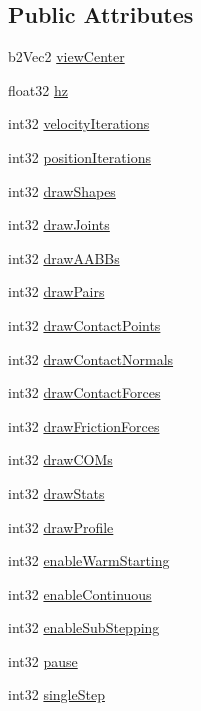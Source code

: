 \subsection*{Public Attributes}
\begin{DoxyCompactItemize}
\item 
b2\-Vec2 \hyperlink{structSettings_a9f73ff7bfe24c0ec00f00637ad660afa}{view\-Center}
\item 
float32 \hyperlink{structSettings_a81f52938e3bfe4976755e77e940ca0e0}{hz}
\item 
int32 \hyperlink{structSettings_aef56168e9043d5a6f264a57fc0d0823a}{velocity\-Iterations}
\item 
int32 \hyperlink{structSettings_ae66b1defd12295dd5dce2362fcdad12f}{position\-Iterations}
\item 
int32 \hyperlink{structSettings_a4a8172dd21368b12a8442723f30914bf}{draw\-Shapes}
\item 
int32 \hyperlink{structSettings_ab03e798642ff7d039d5efa3e0d5e86cb}{draw\-Joints}
\item 
int32 \hyperlink{structSettings_a7ac6f10e3c8e20e8e9a7b7fa90f4b5b5}{draw\-A\-A\-B\-Bs}
\item 
int32 \hyperlink{structSettings_a393ea9824e615323134a9f8514d51ef7}{draw\-Pairs}
\item 
int32 \hyperlink{structSettings_afdc2b5f2611fc52d082e2ff69242cd9b}{draw\-Contact\-Points}
\item 
int32 \hyperlink{structSettings_ad95473a203267e76c613f3a7c2677836}{draw\-Contact\-Normals}
\item 
int32 \hyperlink{structSettings_a55646015c8d056282396c5a8511bc99a}{draw\-Contact\-Forces}
\item 
int32 \hyperlink{structSettings_a9a5046eae0535fff1e23479d18ecaa15}{draw\-Friction\-Forces}
\item 
int32 \hyperlink{structSettings_af5595d1914a8f3b76b43224cc16f05fc}{draw\-C\-O\-Ms}
\item 
int32 \hyperlink{structSettings_ac1dc47bd42cb02ab564d16973c3ac235}{draw\-Stats}
\item 
int32 \hyperlink{structSettings_ab2f2f8bbbd3cf9997000d229f4caff31}{draw\-Profile}
\item 
int32 \hyperlink{structSettings_adb8ab5ccbdefc201db87e2d451df1758}{enable\-Warm\-Starting}
\item 
int32 \hyperlink{structSettings_a5c4a2f9de9c8934d149dc352fc600bf1}{enable\-Continuous}
\item 
int32 \hyperlink{structSettings_a13446b165febfb28b59adcce030d29cc}{enable\-Sub\-Stepping}
\item 
int32 \hyperlink{structSettings_a8be95d53012a813806bd14fdf3d02885}{pause}
\item 
int32 \hyperlink{structSettings_ab26356e864848394be4ae8bc76850d05}{single\-Step}
\end{DoxyCompactItemize}


